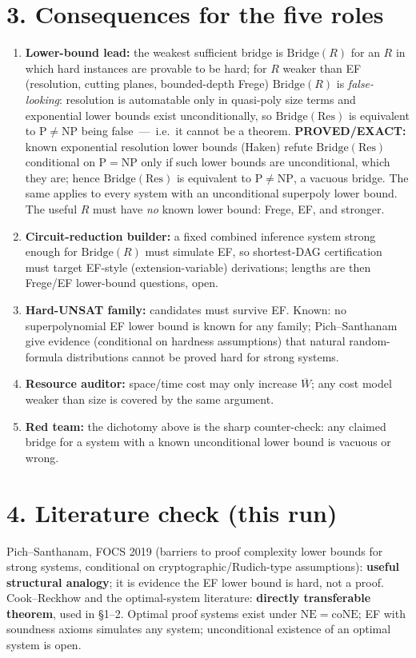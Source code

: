 \documentclass{article}
\begin{document}
\section*{3. Consequences for the five roles}
\begin{enumerate}
\item \textbf{Lower-bound lead:} the weakest sufficient bridge is $\mathrm{Bridge}(R)$ for an $R$ in which hard instances are provable to be hard; for $R$ weaker than EF (resolution, cutting planes, bounded-depth Frege) $\mathrm{Bridge}(R)$ is \emph{false-looking}: resolution is automatable only in quasi-poly size terms and exponential lower bounds exist unconditionally, so $\mathrm{Bridge}(\mathrm{Res})$ is equivalent to $\mathrm{P}\ne\mathrm{NP}$ being false \,---\, i.e.\ it cannot be a theorem. \textbf{PROVED/EXACT:} known exponential resolution lower bounds (Haken) refute $\mathrm{Bridge}(\mathrm{Res})$ conditional on $\mathrm{P=NP}$ only if such lower bounds are unconditional, which they are; hence $\mathrm{Bridge}(\mathrm{Res})$ is equivalent to $\mathrm{P}\ne\mathrm{NP}$, a vacuous bridge. The same applies to every system with an unconditional superpoly lower bound. The useful $R$ must have \emph{no} known lower bound: Frege, EF, and stronger.
\item \textbf{Circuit-reduction builder:} a fixed combined inference system strong enough for $\mathrm{Bridge}(R)$ must simulate EF, so shortest-DAG certification must target EF-style (extension-variable) derivations; lengths are then Frege/EF lower-bound questions, open.
\item \textbf{Hard-UNSAT family:} candidates must survive EF. Known: no superpolynomial EF lower bound is known for any family; Pich--Santhanam give evidence (conditional on hardness assumptions) that natural random-formula distributions cannot be proved hard for strong systems.
\item \textbf{Resource auditor:} space/time cost may only increase $\overline W$; any cost model weaker than size is covered by the same argument.
\item \textbf{Red team:} the dichotomy above is the sharp counter-check: any claimed bridge for a system with a known unconditional lower bound is vacuous or wrong.
\end{enumerate}

\section*{4. Literature check (this run)}
Pich--Santhanam, FOCS 2019 (barriers to proof complexity lower bounds for strong systems, conditional on cryptographic/Rudich-type assumptions): \textbf{useful structural analogy}; it is evidence the EF lower bound is hard, not a proof. Cook--Reckhow and the optimal-system literature: \textbf{directly transferable theorem}, used in \S1--2. Optimal proof systems exist under $\mathrm{NE}=\mathrm{coNE}$; EF with soundness axioms simulates any system; unconditional existence of an optimal system is open.
\end{document}
